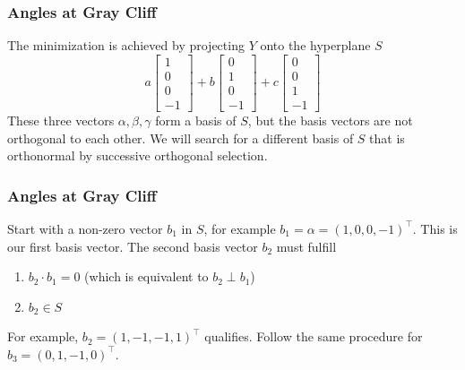 \documentclass[xcolor=dvipsnames]{beamer}
\begin{document}
\begin{frame}
  \frametitle{Angles at Gray Cliff}
  The minimization is achieved by projecting $Y$ onto the hyperplane $S$
  \begin{equation}
    \label{eq:shohyaec}
    a\left[
      \begin{array}{c}
        1 \\
        0 \\
        0 \\
        -1
      \end{array}\right]+b\left[
      \begin{array}{c}
        0 \\
        1 \\
        0 \\
        -1
      \end{array}\right]+c\left[
      \begin{array}{c}
        0 \\
        0 \\
        1 \\
        -1
      \end{array}\right]
  \end{equation}
  These three vectors $\alpha,\beta,\gamma$ form a basis of $S$, but
  the basis vectors are not orthogonal to each other. We will search
  for a different basis of $S$ that is orthonormal by successive
  orthogonal selection.
\end{frame}

\begin{frame}
  \frametitle{Angles at Gray Cliff}
  Start with a non-zero vector $b_{1}$ in $S$, for example
  $b_{1}=\alpha=(1,0,0,-1)^{\intercal}$. This is our first basis
  vector. The second basis vector $b_{2}$ must fulfill
  \begin{enumerate}
  \item $b_{2}\cdot{}b_{1}=0$ (which is equivalent to
    $b_{2}\perp{}b_{1}$)
  \item $b_{2}\in{}S$
  \end{enumerate}
For example, $b_{2}=(1,-1,-1,1)^{\intercal}$ qualifies. Follow the
same procedure for $b_{3}=(0,1,-1,0)^{\intercal}$.
\end{frame}
\end{document}
